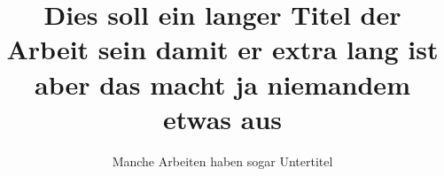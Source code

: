 \documentclass[online,a4paper]{isw}
\begin{document}
    \frontmatter
    
    \maketitle
    
    \begin{otherlanguage}{ngerman}
        \title{Dies soll ein langer Titel der Arbeit sein damit er extra lang ist aber das macht ja niemandem etwas aus}
        \subtitle{Manche Arbeiten haben sogar Untertitel}
        
        \maketitle
    \end{otherlanguage}
    
    
    
    \begin{thesisabstract}
        \lipsum
    \end{thesisabstract}
    
    \begin{otherlanguage}{ngerman}
        \begin{thesisabstract}
            \lipsum
        \end{thesisabstract}
    \end{otherlanguage}
    
    \tableofcontents
    \listoffigures
    \listoftables
    
\end{document}
